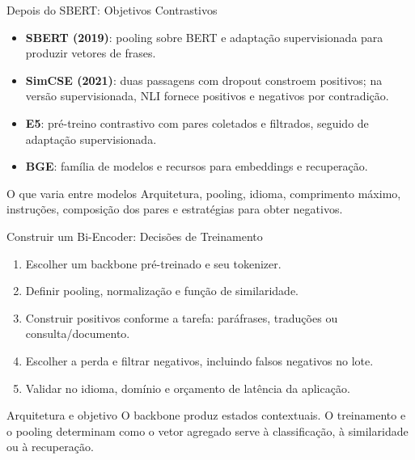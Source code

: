 \documentclass[aspectratio=169, xcolor=dvipsnames]{beamer}
\begin{document}
  \begin{frame}{Depois do SBERT: Objetivos Contrastivos}
    \begin{itemize}
      \item \textbf{SBERT (2019)}: pooling sobre BERT e adaptação
      supervisionada para produzir vetores de frases\cite{reimers2019sbert}.
      \item \textbf{SimCSE (2021)}: duas passagens com dropout constroem
      positivos; na versão supervisionada, NLI fornece positivos e
      negativos por contradição\cite{gao2021simcse}.
      \item \textbf{E5}: pré-treino contrastivo com pares coletados e
      filtrados, seguido de adaptação supervisionada\cite{wang2022e5}.
      \item \textbf{BGE}: família de modelos e recursos para embeddings
      e recuperação\cite{xiao2024bge}.
    \end{itemize}
    \begin{block}{O que varia entre modelos}
      Arquitetura, pooling, idioma, comprimento máximo, instruções,
      composição dos pares e estratégias para obter negativos.
    \end{block}
  \end{frame}

  \begin{frame}{Construir um Bi-Encoder: Decisões de Treinamento}
    \begin{enumerate}
      \item Escolher um backbone pré-treinado e seu tokenizer.
      \item Definir pooling, normalização e função de similaridade.
      \item Construir positivos conforme a tarefa: paráfrases, traduções ou consulta/documento.
      \item Escolher a perda e filtrar negativos, incluindo falsos negativos no lote.
      \item Validar no idioma, domínio e orçamento de latência da aplicação.
    \end{enumerate}
    \begin{block}{Arquitetura e objetivo}
      O backbone produz estados contextuais. O treinamento e o pooling
      determinam como o vetor agregado serve à classificação, à similaridade
      ou à recuperação.
    \end{block}
  \end{frame}
\end{document}
